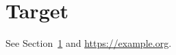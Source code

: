 \documentclass{article}
\begin{document}
\section{Target}\label{sec:target}
See Section~\ref{sec:target} and \url{https://example.org}.
\end{document}
